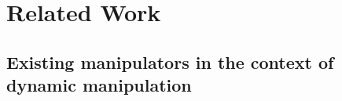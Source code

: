 \section{Related Work}


\subsection{Existing manipulators in the context of dynamic manipulation}
\label{sec:existing_manipulators}

\begin{table*}[ht]
\end{table*}
